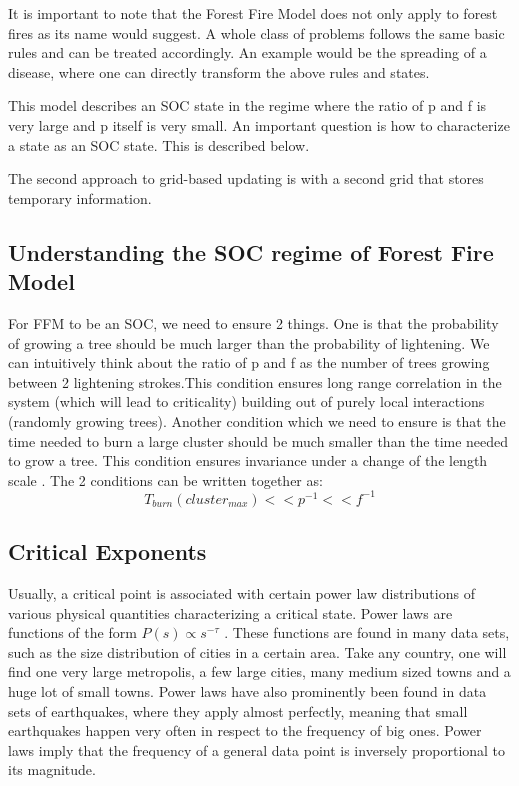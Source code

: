 \documentclass[11pt]{article}
\def \beq{\begin{equation}}
\def \eeq{\end{equation}}
\def \beq{\begin{equation}}
\def \eeq{\end{equation}}
\begin{document}
It is important to note that the Forest Fire Model does not only apply to forest fires as its name would suggest. A whole class of problems follows the same basic rules and can be treated accordingly. An example would be the spreading of a disease, where one can directly transform the above rules and states.

This model describes an SOC state in the regime where the ratio of p and f is very large and p itself is very small. An important question is how to characterize a state as an SOC state. This is described below.


The second approach to grid-based updating is with a second grid that stores temporary information. \cite{ref9}

\subsection{Understanding the SOC regime of Forest Fire Model}

For FFM to be an SOC, we need to ensure 2 things. One is that the probability of growing a tree should be much larger than the probability of lightening. We can intuitively think about the ratio of p and f as the number of trees growing between 2 lightening strokes.This condition ensures long range correlation in the system (which will lead to criticality) building out of purely local interactions (randomly growing trees). Another condition which we need to ensure is that the time needed to burn a large cluster should be much smaller than the time needed to grow a tree. This condition ensures invariance under a change of the length scale \cite{ref1,ref9}. The 2 conditions can be written together as:
\beq
T_{burn}(cluster_{max})<<p^{-1}<<f^{-1}
\eeq

\subsection{Critical Exponents}
Usually, a critical point is associated with certain power law distributions of various physical quantities characterizing a critical state. Power laws are functions of the form $ P(s) \varpropto s^{-\tau}$ . These functions are found in many data sets, such as the size distribution of cities in a certain area. Take any country, one will find one very large metropolis, a few large cities, many medium sized towns and a huge lot of small towns. Power laws have also prominently been found in data sets of earthquakes, where they apply almost perfectly, meaning that small earthquakes happen very often in respect to the frequency of big ones. Power laws imply that the frequency of a general data point is inversely proportional to its magnitude. 
\end{document}
